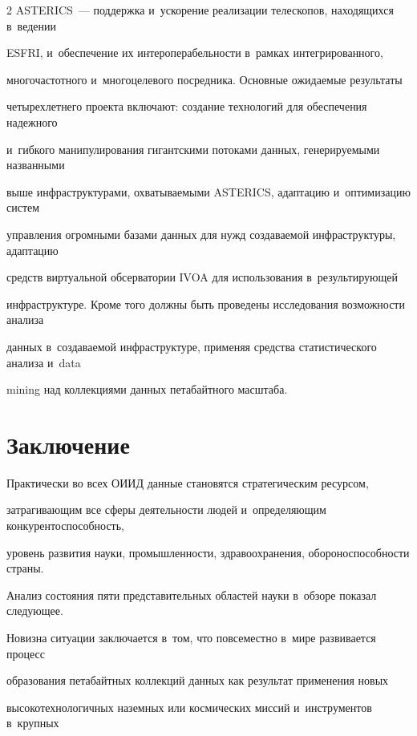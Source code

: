 \begin{multicols}{2}
ASTERICS~--- поддержка и~ускорение реализации телескопов, находящихся в~ведении 


ESFRI, и~обеспечение их интероперабельности в~рамках интегрированного, 


многочастотного и~многоцелевого посредника. Основные ожидаемые результаты 


четырехлетнего проекта включают: создание технологий для обеспечения надежного 


и~гибкого манипулирования гигантскими потоками данных, генерируемыми названными 


выше инфраструктурами, охватываемыми ASTERICS, адап\-та\-цию и~оптимизацию систем 


управления огромными базами данных для нужд создаваемой инфраструктуры, адап\-та\-цию 


средств виртуальной обсерватории IVOA для использования в~результирующей 


инфраструктуре. Кроме того должны быть проведены исследования возможности анализа 


данных в~создаваемой инфраструктуре, применяя средства статистического анализа и~data 


mining над коллекциями данных петабайтного масштаба.





\section{Заключение}





  Практически во всех ОИИД данные становятся стратегическим ресурсом, 


затрагивающим все сферы деятельности людей и~определяющим конкурентоспособность, 


уровень развития науки, промышленности, здравоохранения, обороноспособности страны. 


Анализ состояния пяти представительных областей науки в~обзоре показал следующее.


  


  Новизна ситуации заключается в~том, что повсеместно в~мире развивается процесс 


образования петабайтных коллекций данных как результат применения новых 


высокотехнологичных наземных или космических миссий и~инструментов в~крупных 



\end{multicols}
